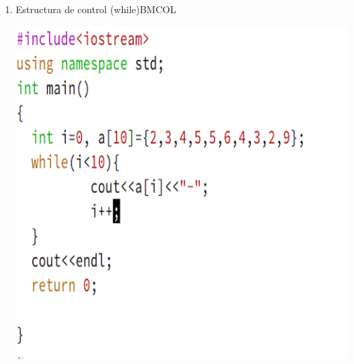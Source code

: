 \documentclass[presentation, aspectratio=54]{beamer}
\begin{document}
\begin{enumerate}
\item Estructura de control (while)\hfill{}\textsc{BMCOL}
\label{sec:org9ecfa1a}
\begin{center}
\includegraphics[width=.9\linewidth]{./images/codigo/code-while.png}
\end{center}
\end{enumerate}
\end{document}
